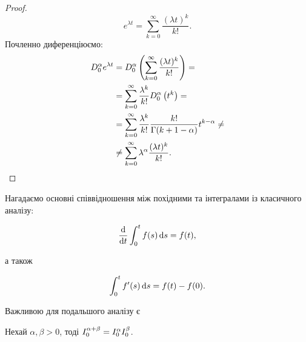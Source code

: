 \begin{proof}
    \begin{equation}
        e^{\lambda t} = \sum_{k = 0}^\infty \frac{(\lambda t)^k}{k!}.
    \end{equation}
    Почленно диференціюємо:
    \begin{equation}
        \begin{aligned} 
            D_0^{\alpha} e^{\lambda t} 
            &= D_0^{\alpha} \left( \sum_{k = 0}^\infty \frac{(\lambda t)^k}{k!} \right) = \\
            &= \sum_{k = 0}^\infty \frac{\lambda^k}{k!} D_0^{\alpha} \left( t^k \right) = \\
            &= \sum_{k = 0}^\infty \frac{\lambda^k}{k!} \frac{k!}{\Gamma(k + 1 - \alpha)} t^{k - \alpha} \ne \\
            &\ne \sum_{k = 0}^\infty \lambda^\alpha \frac{(\lambda t)^k}{k!}.
        \end{aligned}
    \end{equation}
\end{proof}

Нагадаємо основні співвідношення між похідними та інтегралами із класичного аналізу:
\begin{th_formula}
    \begin{equation}
        \frac{\mathop{}\!\mathrm{d}}{\mathop{}\!\mathrm{d} t} \int_0^t f(s) \mathop{}\!\mathrm{d} s = f(t),
    \end{equation}
\end{th_formula}
а також
\begin{th_formula}
    \begin{equation}
        \int_0^t f'(s) \mathop{}\!\mathrm{d} s = f(t) - f(0).
    \end{equation}
\end{th_formula}

Важливою для подальшого аналізу є
\begin{property}
    Нехай $\alpha, \beta > 0$, тоді $I_0^{\alpha + \beta} = I_0^{\alpha} I_0^{\beta}$.
\end{property}

